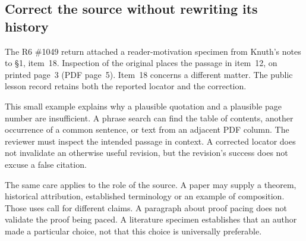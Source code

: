\subsection{Correct the source without rewriting its history}

The R6 \#1049 return attached a reader-motivation specimen from Knuth's notes
to \S1, item~18. Inspection of the original places the passage in item~12,
on printed page~3 (PDF page~5). Item~18 concerns a different matter. The
public lesson record retains both the reported locator and the correction.

This small example explains why a plausible quotation and a plausible page
number are insufficient. A phrase search can find the table of contents,
another occurrence of a common sentence, or text from an adjacent PDF column.
The reviewer must inspect the intended passage in context. A corrected locator
does not invalidate an otherwise useful revision, but the revision's success
does not excuse a false citation.

The same care applies to the role of the source. A paper may supply a theorem,
historical attribution, established terminology or an example of composition.
Those uses call for different claims. A paragraph about proof pacing does not
validate the proof being paced. A literature specimen establishes that an
author made a particular choice, not that this choice is universally preferable.
